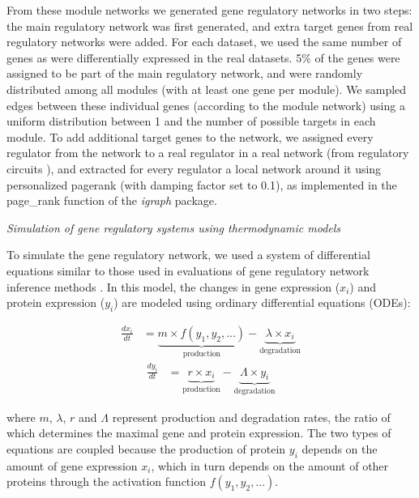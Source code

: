 From these module networks we generated gene regulatory networks in two steps: the main regulatory network was first generated, and extra target genes from real regulatory networks  were added. For each dataset, we used the same number of genes as were differentially expressed in the real datasets. 5$\%$ of the genes were assigned to be part of the main regulatory network, and were randomly distributed among all modules (with at least one gene per module). We sampled edges between these individual genes (according to the module network) using a uniform distribution between 1 and the number of possible targets in each module. To add additional target genes to the network, we assigned every regulator from the network to a real regulator in a real network (from regulatory circuits \cite{marbach_tissuespecificregulatorycircuits_2016}), and extracted for every regulator a local network around it using personalized pagerank (with damping factor set to 0.1), as implemented in the page\_rank function of the \textit{igraph} package. 

\hfill\break
\textit{Simulation of gene regulatory systems using thermodynamic models}
\hfill\break

To simulate the gene regulatory network, we used a system of differential equations similar to those used in evaluations of gene regulatory network inference methods \cite{marbach_wisdomcrowdsrobust_2012}. In this model, the changes in gene expression ($x_i$) and protein expression ($y_i$) are modeled using ordinary differential equations \cite{schaffter_genenetweaversilicobenchmark_2011} (ODEs):



$$
\begin{aligned}
\label{eq:mrna_ode}
\frac{dx_i}{dt} &= \underbrace{m \times f(y_1, y_2, ...)}_\text{production} - \underbrace{\lambda \times x_i}_\text{degradation}
\end{aligned}
$$
$$
\begin{aligned}
\label{eq:prot_ode}
\frac{dy_i}{dt} &= \underbrace{r \times x_i}_\text{production} - \underbrace{\Lambda \times y_i}_\text{degradation}
\end{aligned}
$$

where $m$, $\lambda$, $r$ and $\Lambda$ represent production and degradation rates, the ratio of which determines the maximal gene and protein expression. The two types of equations are coupled because the production of protein $y_i$ depends on the amount of gene expression $x_i$, which in turn depends on the amount of other proteins through the activation function $f(y_1, y_2, ...)$.

